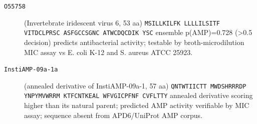 \begin{description}
\item[\texttt{O55758}] (Invertebrate iridescent virus 6, 53 aa) \texttt{MSILLKILFK LLLLILSITF VITDCLPRSC ASFGCCSGNC ATWCDQCDIK YSC}
  ensemble p(AMP)=0.728 (>0.5 decision) predicts antibacterial activity; testable by broth-microdilution MIC assay vs E. coli K-12 and S. aureus ATCC 25923.
\item[\texttt{InstiAMP-09a-1a}] (annealed derivative of InstiAMP-09a-1, 57 aa) \texttt{QNTWTIICTT MWDSHRRRDP YNPYMVWRRM KTFCNTKEAL WFVGICPFNF CVFLTTY}
  annealed derivative scoring higher than its natural parent; predicted AMP activity verifiable by MIC assay; sequence absent from APD6/UniProt AMP corpus.
\end{description}

